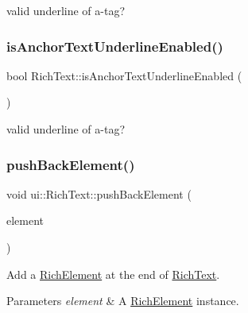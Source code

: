 valid underline of a-\/tag? \mbox{\label{classui_1_1RichText_ab133b87aace1a3d5e34cde0fb6183bde}} 
\subsubsection{\texorpdfstring{is\+Anchor\+Text\+Underline\+Enabled()}{isAnchorTextUnderlineEnabled()}\hspace{0.1cm}{\footnotesize\ttfamily [2/2]}}
{\footnotesize\ttfamily bool Rich\+Text\+::is\+Anchor\+Text\+Underline\+Enabled (\begin{DoxyParamCaption}{ }\end{DoxyParamCaption})}

valid underline of a-\/tag? \mbox{\label{classui_1_1RichText_a94dcc56e14381d00fa01b185cd797037}} 
\subsubsection{\texorpdfstring{push\+Back\+Element()}{pushBackElement()}\hspace{0.1cm}{\footnotesize\ttfamily [1/2]}}
{\footnotesize\ttfamily void ui\+::\+Rich\+Text\+::push\+Back\+Element (\begin{DoxyParamCaption}\item[{\hyperlink{classui_1_1RichElement}{Rich\+Element} $\ast$}]{element }\end{DoxyParamCaption})}



Add a \hyperlink{classui_1_1RichElement}{Rich\+Element} at the end of \hyperlink{classui_1_1RichText}{Rich\+Text}. 


\begin{DoxyParams}{Parameters}
{\em element} & A \hyperlink{classui_1_1RichElement}{Rich\+Element} instance. \\
\hline
\end{DoxyParams}
\mbox{\label{classui_1_1RichText_a9d9c7e5a460fec33d81de7811deb44ca}} 
